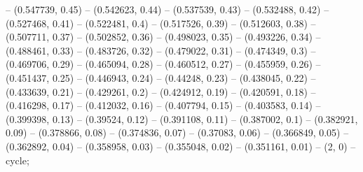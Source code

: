 -- (0.547739, 0.45)
-- (0.542623, 0.44)
-- (0.537539, 0.43)
-- (0.532488, 0.42)
-- (0.527468, 0.41)
-- (0.522481, 0.4)
-- (0.517526, 0.39)
-- (0.512603, 0.38)
-- (0.507711, 0.37)
-- (0.502852, 0.36)
-- (0.498023, 0.35)
-- (0.493226, 0.34)
-- (0.488461, 0.33)
-- (0.483726, 0.32)
-- (0.479022, 0.31)
-- (0.474349, 0.3)
-- (0.469706, 0.29)
-- (0.465094, 0.28)
-- (0.460512, 0.27)
-- (0.455959, 0.26)
-- (0.451437, 0.25)
-- (0.446943, 0.24)
-- (0.44248, 0.23)
-- (0.438045, 0.22)
-- (0.433639, 0.21)
-- (0.429261, 0.2)
-- (0.424912, 0.19)
-- (0.420591, 0.18)
-- (0.416298, 0.17)
-- (0.412032, 0.16)
-- (0.407794, 0.15)
-- (0.403583, 0.14)
-- (0.399398, 0.13)
-- (0.39524, 0.12)
-- (0.391108, 0.11)
-- (0.387002, 0.1)
-- (0.382921, 0.09)
-- (0.378866, 0.08)
-- (0.374836, 0.07)
-- (0.37083, 0.06)
-- (0.366849, 0.05)
-- (0.362892, 0.04)
-- (0.358958, 0.03)
-- (0.355048, 0.02)
-- (0.351161, 0.01)
-- (2, 0)
-- cycle;
